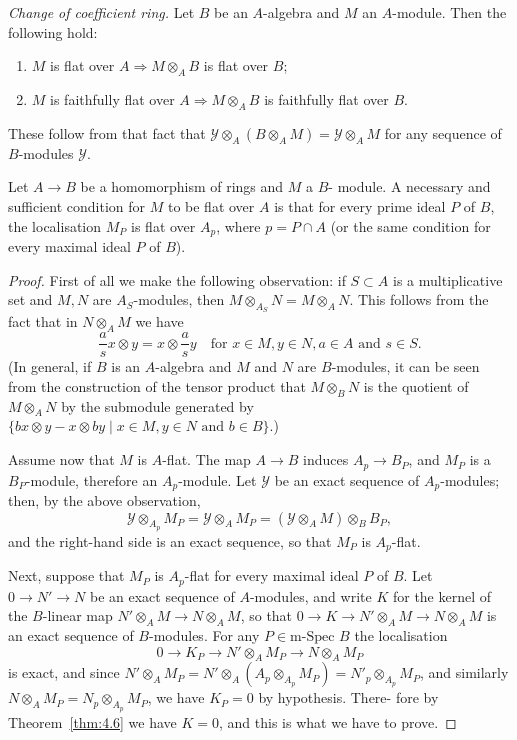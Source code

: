 \emph{Change of coefficient ring.} Let $B$ be an $A$-algebra and $M$ an $A$-module.
Then the following hold:
\begin{enumerate}[(1)]
  \item $M$ is flat over $A \Rightarrow M \otimes_A B$ is flat over $B$;
  \item $M$ is faithfully flat over $A \Rightarrow M \otimes_A B$ is faithfully flat over $B$.
\end{enumerate}
These follow from that fact that $\mathcal{Y} \otimes_A (B \otimes_A M) = \mathcal{Y} \otimes_A M$ for any
sequence of $B$-modules $\mathcal{Y}$.

\begin{theorem}\label{thm:7.1}
Let $A \to B$ be a homomorphism of rings and $M$ a $B$-
module. A necessary and sufficient condition for $M$ to be flat over $A$ is that
for every prime ideal $P$ of $B$, the localisation $M_P$ is flat over $A_p$, where
$p = P \cap A$ (or the same condition for every maximal ideal $P$ of $B$).
\end{theorem}

\begin{proof}
First of all we make the following observation: if $S \subset A$ is a
multiplicative set and $M, N$ are $A_S$-modules, then $M \otimes_{A_S} N = M \otimes_A N$.
This follows from the fact that in $N \otimes_A M$ we have
\[
  \frac{a}{s}x \otimes y = x \otimes \frac{a}{s}y \quad \text{for } x \in M, y \in N, a \in A \text{ and } s \in S.
\]
(In general, if $B$ is an $A$-algebra and $M$ and $N$ are $B$-modules, it can be seen from the construction of the
tensor product that $M \otimes_B N$ is the quotient of $M \otimes_A N$ by the submodule generated
by $\{bx \otimes y - x \otimes by \mid x \in M, y \in N \text{ and } b \in B\}$.)

Assume now that $M$ is $A$-flat. The map $A \to B$ induces $A_p \to B_P$,
and $M_P$ is a $B_P$-module, therefore an $A_p$-module. Let $\mathcal{Y}$ be an exact
sequence of $A_p$-modules; then, by the above observation,
\[
  \mathcal{Y} \otimes_{A_p} M_P = \mathcal{Y} \otimes_A M_P = (\mathcal{Y} \otimes_A M) \otimes_B B_P,
\]
and the right-hand side is an exact sequence, so that $M_P$ is $A_p$-flat.

Next, suppose that $M_P$ is $A_p$-flat for every maximal ideal $P$ of $B$.
Let $0 \to N' \to N$ be an exact sequence of $A$-modules, and write $K$
for the kernel of the $B$-linear map $N' \otimes_A M \to N \otimes_A M$, so that
$0 \to K \to N' \otimes_A M \to N \otimes_A M$ is an exact sequence of $B$-modules. For
any $P \in \text{m-Spec } B$ the localisation
\[
  0 \to K_P \to N' \otimes_A M_P \to N \otimes_A M_P
\]
is exact, and since $N' \otimes_A M_P = N' \otimes_A (A_p \otimes_{A_p} M_P) = N'_p \otimes_{A_p} M_P$, and
similarly $N \otimes_A M_P = N_p \otimes_{A_p} M_P$, we have $K_P = 0$ by hypothesis. There-
fore by Theorem~\ref{thm:4.6} we have $K = 0$, and this is what we have to prove.
\end{proof}

